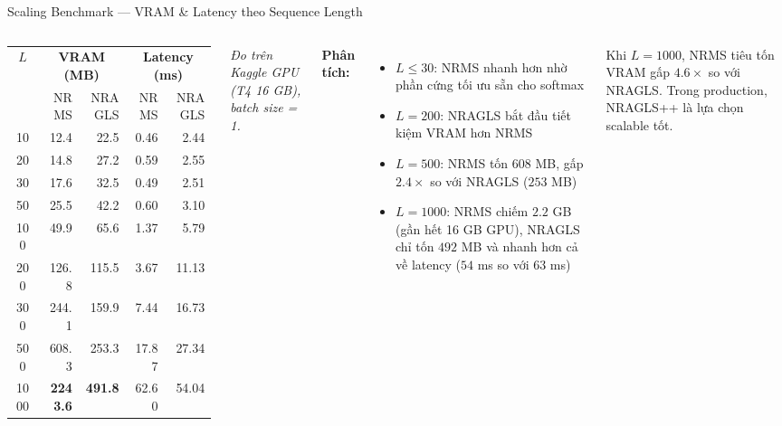 \documentclass[aspectratio=169,11pt]{beamer}
\begin{document}
\begin{frame}{Scaling Benchmark --- VRAM \& Latency theo Sequence Length}
  \begin{columns}[T]
      \begin{table}
        \footnotesize
        \begin{tabular}{crrrr}
          \toprule
          \multirow{2}{*}{$L$}
            & \multicolumn{2}{c}{\textbf{VRAM (MB)}}
            & \multicolumn{2}{c}{\textbf{Latency (ms)}}\\
          \cmidrule(lr){2-3}\cmidrule(lr){4-5}
            & NRMS & NRAGLS & NRMS & NRAGLS\\
          \midrule
          10   & 12.4  & 22.5   & 0.46  & 2.44\\
          20   & 14.8  & 27.2   & 0.59  & 2.55\\
          30   & 17.6  & 32.5   & 0.49  & 2.51\\
          50   & 25.5  & 42.2   & 0.60  & 3.10\\
          100  & 49.9  & 65.6   & 1.37  & 5.79\\
          200  & 126.8 & 115.5  & 3.67  & 11.13\\
          300  & 244.1 & 159.9  & 7.44  & 16.73\\
          500  & \textcolor{warnred}{608.3} & \textcolor{accentteal}{253.3} & 17.87 & 27.34\\
          1000 & \textcolor{warnred}{\textbf{2243.6}} & \textcolor{accentteal}{\textbf{491.8}} & 62.60 & 54.04\\
          \bottomrule
        \end{tabular}
      \end{table}
      {\footnotesize \textit{Đo trên Kaggle GPU (T4 16 GB), batch size = 1.}}

      \textbf{Phân tích:}
      \begin{itemize}
        \item $L \leq 30$: NRMS nhanh hơn nhờ phần cứng tối ưu sẵn cho softmax
        \item $L = 200$: NRAGLS bắt đầu tiết kiệm VRAM hơn NRMS
        \item $L = 500$: NRMS tốn $608$ MB, gấp $2.4\times$ so với NRAGLS ($253$ MB)
        \item $L = 1000$: NRMS chiếm $2.2$ GB (gần hết 16 GB GPU), NRAGLS chỉ tốn $492$ MB và nhanh hơn cả về latency ($54$ ms so với $63$ ms)
      \end{itemize}
      \begin{goodbox}[]
        \footnotesize
        Khi $L = 1000$, NRMS tiêu tốn VRAM gấp $4.6\times$ so với NRAGLS.
        Trong production, NRAGLS++ là lựa chọn scalable tốt.
      \end{goodbox}
  \end{columns}
\end{frame} 
\end{document}

